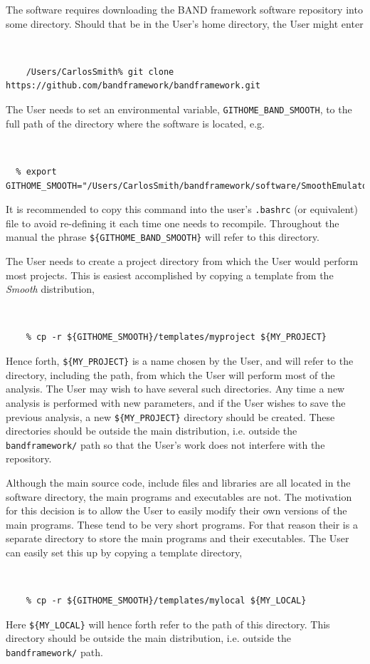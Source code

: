 \documentclass[UserManual.tex]{subfiles}
\begin{document}
The software requires downloading the BAND framework software repository into some directory. Should that be in the User's home directory, the User might enter
{\tt 
\begin{verbatim}
    /Users/CarlosSmith% git clone https://github.com/bandframework/bandframework.git
\end{verbatim}
}
The User needs to set an environmental variable, {\tt GITHOME\_BAND\_SMOOTH}, to the full path of the directory where the software is located, e.g. 
{\tt
\begin{verbatim}
  % export GITHOME_SMOOTH="/Users/CarlosSmith/bandframework/software/SmoothEmulator"
\end{verbatim}
}
It is recommended to copy this command into the user's {\tt .bashrc} (or equivalent) file to avoid re-defining it each time one needs to recompile. Throughout the manual the phrase {\tt \$\{GITHOME\_BAND\_SMOOTH\}} will refer to this directory. 

The User needs to create a project directory from which the User would perform most projects. This is easiest accomplished by copying a template from the {\it Smooth} distribution,
{\tt
\begin{verbatim}
    % cp -r ${GITHOME_SMOOTH}/templates/myproject ${MY_PROJECT}
\end{verbatim}
}
Hence forth, {\tt \$\{MY\_PROJECT\}} is a name chosen by the User, and will refer to the directory, including the path, from which the User will perform most of the analysis. The User may wish to have several such directories. Any time a new analysis is performed with new parameters, and if the User wishes to save the previous analysis, a new {\tt \$\{MY\_PROJECT\}} directory should be created. These directories should be outside the main distribution, i.e. outside the {\tt bandframework/} path so that the User's work does not interfere with the repository. 

Although the main source code, include files and libraries are all located in the software directory, the main programs and executables are not. The motivation for this decision is to allow the User to easily modify their own versions of the main programs. These tend to be very short programs. For that reason their is a separate directory to store the main programs and their executables. The User can easily set this up by copying a template directory,
{\tt 
\begin{verbatim}
    % cp -r ${GITHOME_SMOOTH}/templates/mylocal ${MY_LOCAL}
\end{verbatim}
}
Here {\tt \$\{MY\_LOCAL\}} will hence forth refer to the path of this directory. This directory should be outside the main distribution, i.e. outside the {\tt bandframework/} path. 
\end{document}
